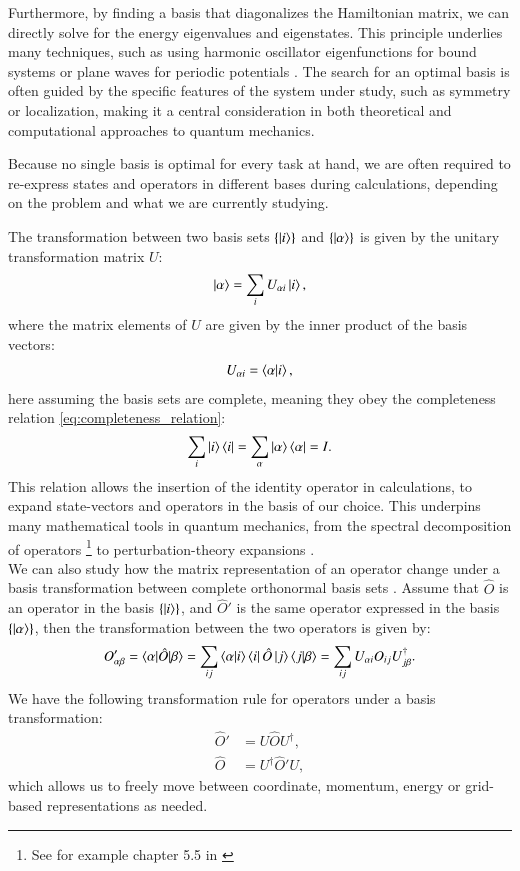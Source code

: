 \documentclass{subfiles}
\begin{document}
Furthermore, by finding a basis that diagonalizes the Hamiltonian matrix, we can directly solve for the energy eigenvalues and eigenstates. This principle underlies many techniques, such as using harmonic oscillator eigenfunctions for bound systems or plane waves for periodic potentials \cite{griffiths2018introduction, kittel2018introduction}. The search for an optimal basis is often guided by the specific features of the system under study, such as symmetry or localization, making it a central consideration in both theoretical and computational approaches to quantum mechanics. 

Because no single basis is optimal for every task at hand, we are often required to re-express states and operators in different bases during calculations, depending on the problem and what we are currently studying. 

The transformation between two basis sets $\{\ket{i}\}$ and $\{\ket{\alpha}\}$ is given by the unitary transformation matrix $U$:
\begin{align*}
    \ket{\alpha} = \sum_i U_{\alpha i}\ket{i},
\end{align*}
where the matrix elements of $U$ are given by the inner product of the basis vectors:
\begin{align*}
    U_{\alpha i} = \braket{\alpha|i},
\end{align*}
here assuming the basis sets are complete, meaning they obey the completeness relation \ref{eq:completeness_relation}:
\begin{align*}
    \sum_i \ket{i}\bra{i} = \sum_\alpha \ket{\alpha}\bra{\alpha} = I.
\end{align*}
This relation allows the insertion of the identity operator in calculations, to expand state-vectors and operators in the basis of our choice. This underpins many mathematical tools in quantum mechanics, from the spectral decomposition of operators \footnote{See for example chapter 5.5 in \cite{strang2000linear}} to perturbation-theory expansions \cite{griffiths2018introduction, berera2021quantum, sakurai1986modern}. \\


We can also study how the matrix representation of an operator change under a basis transformation between complete orthonormal basis sets \cite{szabo1996modern}.
Assume that $\hat O$ is an operator in the basis $\{\ket{i}\}$, and $\hat O'$ is the same operator expressed in the basis $\{\ket{\alpha}\}$, then the transformation between the two operators is given by:
\begin{align*}
    O'_{\alpha\beta} = \braket{\alpha|\hat O|\beta} = \sum_{ij}\braket{\alpha|i}\bra{i}\hat O\ket{j}\braket{j|\beta} = \sum_{ij}U_{\alpha i}O_{ij}U^\dagger_{j\beta}.
\end{align*}
We have the following transformation rule for operators under a basis transformation:
\begin{align*}
    \hat O' &= U\hat OU^\dagger, \\
    \hat O &= U^\dagger\hat O'U,
\end{align*}
which allows us to freely move between coordinate, momentum, energy or grid-based representations as needed.
\end{document}
